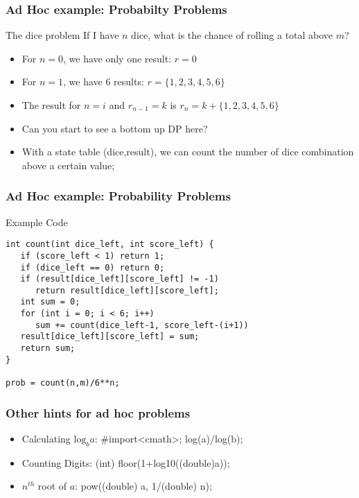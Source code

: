 \documentclass{beamer}
\begin{document}
\begin{frame}
  \frametitle{Ad Hoc example: Probabilty Problems}

  {\smaller
  \begin{block}{The dice problem}
    If I have $n$ dice, what is the chance of rolling a total above $m$?
  \end{block}
 
  \begin{itemize}
  \item For $n=0$, we have only one result: $r=0$
  \item For $n=1$, we have 6 results: $r = \{1,2,3,4,5,6\}$
  \item The result for $n=i$ and $r_{n-1}=k$ is $r_n = k + \{1,2,3,4,5,6\}$ 

    \bigskip

  \item Can you start to see a bottom up DP here?
  \item With a state table (dice,result), we can count the number of
    dice combination above a certain value;

  \end{itemize}
  }
\end{frame}

\begin{frame}
  \frametitle{Ad Hoc example: Probability Problems}
  \begin{exampleblock}{Example Code}
{\small
\begin{verbatim}
int count(int dice_left, int score_left) {
   if (score_left < 1) return 1;
   if (dice_left == 0) return 0;
   if (result[dice_left][score_left] != -1)
      return result[dice_left][score_left];       
   int sum = 0;
   for (int i = 0; i < 6; i++)
      sum += count(dice_left-1, score_left-(i+1))
   result[dice_left][score_left] = sum;
   return sum;
}

prob = count(n,m)/6**n;

\end{verbatim}
}
  \end{exampleblock}
\end{frame}


\begin{frame}
  \frametitle{Other hints for ad hoc problems}


  \begin{itemize}
  \item Calculating $\text{log}_ba$: \#import<cmath>; log(a)/log(b);

    \medskip

  \item Counting Digits: (int) floor(1+log10((double)a));
    
    \medskip

  \item $n^{th}$ root of $a$: pow((double) a, 1/(double) n);
  \end{itemize}

\end{frame}
\end{document}
